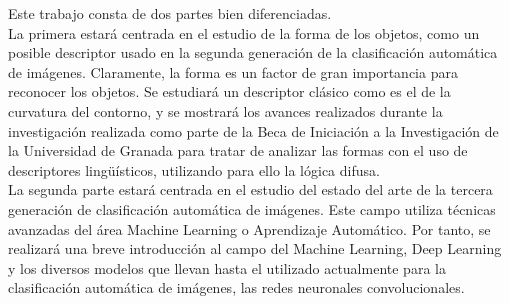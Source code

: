 Este trabajo consta de dos partes bien diferenciadas.\\

La primera estará centrada en el estudio de la forma de los objetos, como un posible descriptor usado en la segunda generación de la clasificación automática de imágenes. Claramente, la forma es un factor de gran importancia para reconocer los objetos. Se estudiará un descriptor clásico como es el de la curvatura del contorno, y se mostrará los avances realizados durante la investigación realizada como parte de la Beca de Iniciación a la Investigación de la Universidad de Granada para tratar de analizar las formas con el uso de descriptores lingüísticos, utilizando para ello la lógica difusa.\\

La segunda parte estará centrada en el estudio del estado del arte de la tercera generación de clasificación automática de imágenes. Este campo utiliza técnicas avanzadas del área Machine Learning o Aprendizaje Automático. Por tanto, se realizará una breve introducción al campo del Machine Learning, Deep Learning y los diversos modelos que llevan hasta el utilizado actualmente para la clasificación automática de imágenes, las redes neuronales convolucionales.\\
